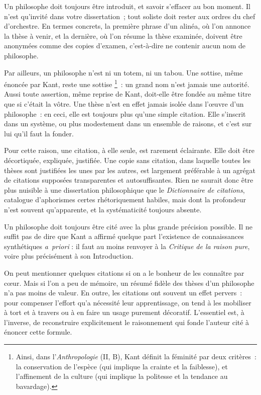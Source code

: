 \documentclass[a4paper]{article}
\begin{document}
Un philosophe doit toujours être introduit, et savoir s'effacer au bon
moment. Il n'est qu'invité dans votre dissertation ; tout soliste doit
rester aux ordres du chef d'orchestre. En termes concrets, la première
phrase d'un alinéa, où l'on annonce la thèse à venir, et la dernière, où
l'on résume la thèse examinée, doivent être anonymées comme des copies
d'examen, c'est-à-dire ne contenir aucun nom de philosophe.

Par ailleurs, un philosophe n'est ni un totem, ni un tabou. Une sottise,
même énoncée par Kant, reste une sottise \footnote{Ainsi, dans l'\emph{Anthropologie} (II, B), Kant définit la féminité par
    deux critères : la conservation de l'espèce (qui implique la crainte
    et la faiblesse), et l'affinement de la culture (qui implique la
    politesse et la tendance au bavardage).
 } : un grand nom n'est jamais
une autorité. Aussi toute assertion, même reprise de Kant, doit-elle
être fondée au même titre que si c'était la vôtre. Une thèse n'est en
effet jamais isolée dans l'œuvre d'un philosophe : en ceci, elle est
toujours plus qu'une simple citation. Elle s'inscrit dans un système, ou
plus modestement dans un ensemble de raisons, et c'est sur lui qu'il
faut la fonder.

Pour cette raison, une citation, à elle seule, est rarement éclairante.
Elle doit être décortiquée, expliquée, justifiée. Une copie sans
citation, dans laquelle toutes les thèses sont justifiées les unes par
les autres, est largement préférable à un agrégat de citations supposées
transparentes et autosuffisantes. Rien ne saurait donc être plus
nuisible à une dissertation philosophique que le \emph{Dictionnaire de citations}, catalogue d'aphorismes certes rhétoriquement habiles, mais
dont la profondeur n'est souvent qu'apparente, et la systématicité
toujours absente.

Un philosophe doit toujours être cité avec la plus grande précision
possible. Il ne suffit pas de dire que Kant a affirmé quelque part
l'existence de connaissances synthétiques \emph{a priori} : il faut au moins
renvoyer à la \emph{Critique de la raison pure}, voire plus précisément à son
Introduction.

On peut mentionner quelques citations si on a le bonheur de les
connaître par cœur. Mais si l'on a peu de mémoire, un résumé fidèle des
thèses d'un philosophe n'a pas moins de valeur. En outre, les citations
ont souvent un effet pervers : pour compenser l'effort qu'a nécessité
leur apprentissage, on tend à les mobiliser à tort et à travers ou à en
faire un usage purement décoratif. L'essentiel est, à l'inverse, de
reconstruire explicitement le raisonnement qui fonde l'auteur cité à
énoncer cette formule.
\end{document}
